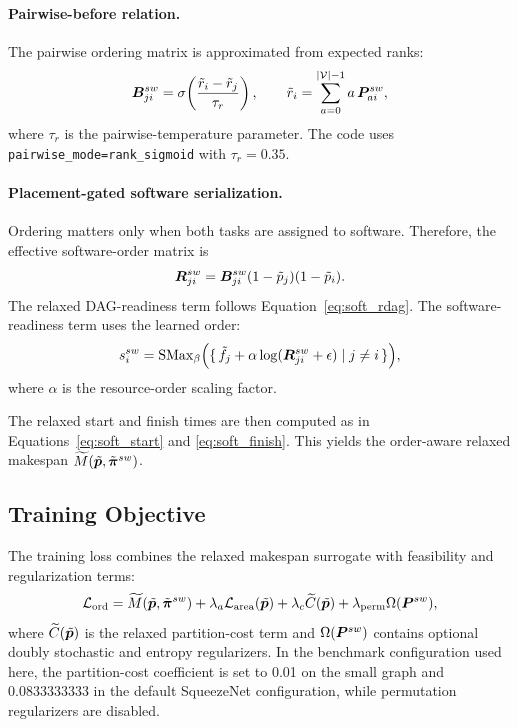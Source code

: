 \paragraph{Pairwise-before relation.}
The pairwise ordering matrix is approximated from expected ranks:
\begin{equation}
\bm{B}^{sw}_{ji}
=
\sigma\!\left(\frac{\tilde{r}_i-\tilde{r}_j}{\tau_r}\right),
\qquad
\tilde{r}_i=\sum_{a=0}^{|\mathcal{V}|-1} a \, \bm{P}^{sw}_{ai},
\end{equation}
where $\tau_r$ is the pairwise-temperature parameter. The code uses \texttt{pairwise\_mode=rank\_sigmoid} with $\tau_r=0.35$.

\paragraph{Placement-gated software serialization.}
Ordering matters only when both tasks are assigned to software. Therefore, the effective software-order matrix is
\begin{equation}
\bm{R}^{sw}_{ji}=
\bm{B}^{sw}_{ji}(1-\tilde{p}_j)(1-\tilde{p}_i).
\label{eq:effective_sw_order}
\end{equation}
The relaxed DAG-readiness term follows Equation~\eqref{eq:soft_rdag}. The software-readiness term uses the learned order:
\begin{equation}
s_i^{sw}
=
\mathrm{SMax}_{\beta}
\Big(
\{\, \tilde{f}_j + \alpha \log(\bm{R}^{sw}_{ji}+\epsilon) \mid j \neq i\,\}
\Big),
\label{eq:sw_readiness_order}
\end{equation}
where $\alpha$ is the resource-order scaling factor.

The relaxed start and finish times are then computed as in Equations~\eqref{eq:soft_start} and \eqref{eq:soft_finish}. This yields the order-aware relaxed makespan $\widetilde{M}(\tilde{\bm{p}},\tilde{\bm{\pi}}^{sw})$.

\subsection{Training Objective}
The training loss combines the relaxed makespan surrogate with feasibility and regularization terms:
\begin{equation}
\mathcal{L}_{\mathrm{ord}}
=
\widetilde{M}(\tilde{\bm{p}},\tilde{\bm{\pi}}^{sw})
+ \lambda_a \mathcal{L}_{\mathrm{area}}(\tilde{\bm{p}})
+ \lambda_c \widetilde{C}(\tilde{\bm{p}})
+ \lambda_{\mathrm{perm}} \Omega(\bm{P}^{sw}),
\label{eq:ordered_loss}
\end{equation}
where $\widetilde{C}(\tilde{\bm{p}})$ is the relaxed partition-cost term and $\Omega(\bm{P}^{sw})$ contains optional doubly stochastic and entropy regularizers. In the benchmark configuration used here, the partition-cost coefficient is set to 0.01 on the small graph and 0.0833333333 in the default SqueezeNet configuration, while permutation regularizers are disabled.


